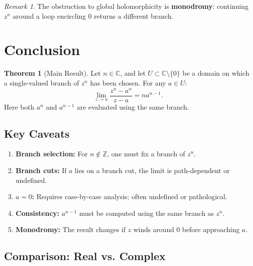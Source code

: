 \documentclass{article}
\theoremstyle{definition}
\newtheorem{theorem}{Theorem}[section]
\theoremstyle{remark}
\newtheorem{remark}{Remark}[section]
\newcommand{\C}{\mathbb{C}}
\newcommand{\Z}{\mathbb{Z}}
\begin{document}
\begin{remark}
The obstruction to global holomorphicity is \textbf{monodromy}: continuing $z^n$ around a loop encircling $0$ returns a different branch.
\end{remark}

\section{Conclusion}

\begin{theorem}[Main Result]
Let $n \in \C$, and let $U \subset \C \setminus \{0\}$ be a domain on which a
single-valued branch of $z^n$ has been chosen. For any $a \in U$:
\begin{equation}
\boxed{\lim_{z \to a} \frac{z^n - a^n}{z - a} = n a^{n-1}.}
\end{equation}
Here both $a^n$ and $a^{n-1}$ are evaluated using the same branch.
\end{theorem}

\subsection{Key Caveats}

\begin{enumerate}
    \item \textbf{Branch selection:} For $n \notin \Z$, one must fix a branch of $z^n$.
    \item \textbf{Branch cuts:} If $a$ lies on a branch cut, the limit is path-dependent or undefined.
    \item \textbf{$a = 0$:} Requires case-by-case analysis; often undefined or pathological.
    \item \textbf{Consistency:} $a^{n-1}$ must be computed using the same branch as $z^n$.
    \item \textbf{Monodromy:} The result changes if $z$ winds around $0$ before approaching $a$.
\end{enumerate}

\subsection{Comparison: Real vs. Complex}
\end{document}

